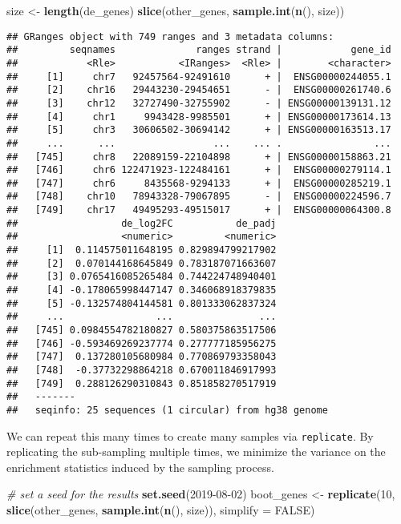 \documentclass[
]{article}
\newenvironment{Shaded}{}{}
\newcommand{\CommentTok}[1]{\textcolor[rgb]{0.38,0.63,0.69}{\textit{#1}}}
\newcommand{\DataTypeTok}[1]{\textcolor[rgb]{0.56,0.13,0.00}{#1}}
\newcommand{\DecValTok}[1]{\textcolor[rgb]{0.25,0.63,0.44}{#1}}
\newcommand{\KeywordTok}[1]{\textcolor[rgb]{0.00,0.44,0.13}{\textbf{#1}}}
\newcommand{\NormalTok}[1]{#1}
\newcommand{\OtherTok}[1]{\textcolor[rgb]{0.00,0.44,0.13}{#1}}
\newcommand{\StringTok}[1]{\textcolor[rgb]{0.25,0.44,0.63}{#1}}
\begin{document}
\begin{Shaded}
\begin{Highlighting}[]
\NormalTok{size <-}\StringTok{ }\KeywordTok{length}\NormalTok{(de_genes)}
\KeywordTok{slice}\NormalTok{(other_genes, }\KeywordTok{sample.int}\NormalTok{(}\KeywordTok{n}\NormalTok{(), size))}
\end{Highlighting}
\end{Shaded}

\begin{verbatim}
## GRanges object with 749 ranges and 3 metadata columns:
##         seqnames              ranges strand |            gene_id
##            <Rle>           <IRanges>  <Rle> |        <character>
##     [1]     chr7   92457564-92491610      + |  ENSG00000244055.1
##     [2]    chr16   29443230-29454651      - |  ENSG00000261740.6
##     [3]    chr12   32727490-32755902      - | ENSG00000139131.12
##     [4]     chr1     9943428-9985501      + | ENSG00000173614.13
##     [5]     chr3   30606502-30694142      + | ENSG00000163513.17
##     ...      ...                 ...    ... .                ...
##   [745]     chr8   22089159-22104898      + | ENSG00000158863.21
##   [746]     chr6 122471923-122484161      + |  ENSG00000279114.1
##   [747]     chr6     8435568-9294133      + |  ENSG00000285219.1
##   [748]    chr10   78943328-79067895      - |  ENSG00000224596.7
##   [749]    chr17   49495293-49515017      + |  ENSG00000064300.8
##                  de_log2FC           de_padj
##                  <numeric>         <numeric>
##     [1]  0.114575011648195 0.829894799217902
##     [2]  0.070144168645849 0.783187071663607
##     [3] 0.0765416085265484 0.744224748940401
##     [4] -0.178065998447147 0.346068918379835
##     [5] -0.132574804144581 0.801333062837324
##     ...                ...               ...
##   [745] 0.0984554782180827 0.580375863517506
##   [746] -0.593469269237774 0.277777185956275
##   [747]  0.137280105680984 0.770869793358043
##   [748]  -0.37732298864218 0.670011846917993
##   [749]  0.288126290310843 0.851858270517919
##   -------
##   seqinfo: 25 sequences (1 circular) from hg38 genome
\end{verbatim}

We can repeat this many times to create many samples via \texttt{replicate}. By
replicating the sub-sampling multiple times, we minimize the variance on the
enrichment statistics induced by the sampling process.

\begin{Shaded}
\begin{Highlighting}[]
\CommentTok{# set a seed for the results}
\KeywordTok{set.seed}\NormalTok{(}\DecValTok{2019-08-02}\NormalTok{)}
\NormalTok{boot_genes <-}\StringTok{ }\KeywordTok{replicate}\NormalTok{(}\DecValTok{10}\NormalTok{,}
                        \KeywordTok{slice}\NormalTok{(other_genes, }\KeywordTok{sample.int}\NormalTok{(}\KeywordTok{n}\NormalTok{(), size)),}
                        \DataTypeTok{simplify =} \OtherTok{FALSE}\NormalTok{)}
\end{Highlighting}
\end{Shaded}
\end{document}
